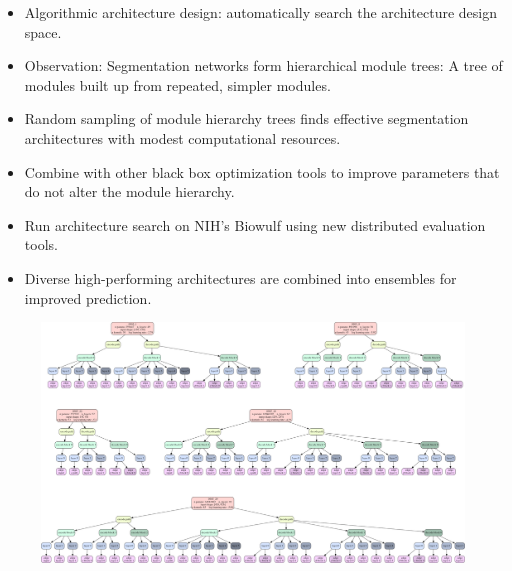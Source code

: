 \documentclass[final]{beamer}
\newlength{\onecolwid}
\renewcommand{\emph}[1]{{\color{nibib2} #1}}
\begin{document}
\begin{frame}[t]
\begin{columns}[t]
\begin{column}{\onecolwid}
\begin{tcolorbox}[title=Architecture Design Algorithms]
\begin{itemize}
\item \emph{Algorithmic} architecture design: automatically search the architecture design space.
\item Observation: Segmentation networks form hierarchical \emph{module trees}: A tree of modules built up from repeated, simpler modules.
\item \emph{Random sampling} of module hierarchy trees finds effective segmentation architectures with modest computational resources.
\item Combine with other \emph{black box optimization} tools to improve parameters that do not alter the module hierarchy.
\item Run architecture search on NIH's \emph{Biowulf} using new distributed evaluation tools.
\item Diverse high-performing architectures are combined into \emph{ensembles} for improved prediction.
\end{itemize}
\end{tcolorbox}
\vspace{.1in}
\begin{center}
\begin{figure}
\includegraphics[width=\linewidth]{fig/ensemble.png}
\end{figure}

\vspace{.1in}


\end{center}
\end{column}
\end{columns}
\end{frame}
\end{document}
